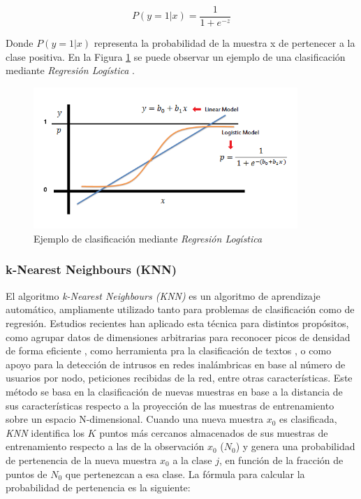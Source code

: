 \[
P(y = 1 | x) = \frac{1}{1 + e^{-z}}
\]

Donde $P(y = 1 | x)$ representa la probabilidad de la muestra x de pertenecer a la clase positiva. En la Figura \ref{LR_BACKGROUND} se puede observar un ejemplo de una clasificación mediante \textit{Regresión Logística} \cite{LR}.


\begin{figure}[h]
	\centering
	\includegraphics[width=10cm]{Figures/Background/LogReg_1.png}
	\caption{Ejemplo de clasificación mediante \textit{Regresión Logística}}
	\label{LR_BACKGROUND}
\end{figure}


\subsubsection*{k-Nearest Neighbours (KNN)}

El algoritmo \textit{k-Nearest Neighbours (KNN)} es un algoritmo de aprendizaje automático, ampliamente utilizado tanto para problemas de clasificación como de regresión. Estudios recientes han aplicado esta técnica para distintos propósitos, como agrupar datos de dimensiones arbitrarias para reconocer picos de densidad de forma eficiente \cite{chen2020fast}, como herramienta pra la clasificación de textos \cite{CHEN2020523}, o como apoyo para la detección de intrusos en redes inalámbricas \cite{liu2022enhanced} en base al número de usuarios por nodo, peticiones recibidas de la red, entre otras características. Este método se basa en la clasificación de nuevas muestras en base a la distancia de sus características respecto a la proyección de las muestras de entrenamiento sobre un espacio N-dimensional. Cuando una nueva muestra $x_0$ es clasificada, \textit{KNN} identifica los $K$ puntos más cercanos almacenados de sus muestras de entrenamiento respecto a las de la observación $x_0$ ($N_0$) y genera una probabilidad de pertenencia de la nueva muestra $x_0$ a la clase $j$, en función de la fracción de puntos de $N_0$ que pertenezcan a esa clase. La fórmula para calcular la probabilidad de pertenencia es la siguiente:

